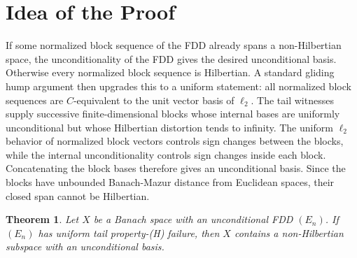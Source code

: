 \documentclass[11pt]{article}
\newtheorem{theorem}{Theorem}
\begin{document}
\section*{Idea of the Proof}

If some normalized block sequence of the FDD already spans a non-Hilbertian
space, the unconditionality of the FDD gives the desired unconditional basis.
Otherwise every normalized block sequence is Hilbertian. A standard gliding
hump argument then upgrades this to a uniform statement: all normalized block
sequences are \(C\)-equivalent to the unit vector basis of \(\ell_2\). The
tail witnesses supply successive finite-dimensional blocks whose internal
bases are uniformly unconditional but whose Hilbertian distortion tends to
infinity. The uniform \(\ell_2\) behavior of normalized block vectors controls
sign changes between the blocks, while the internal unconditionality controls
sign changes inside each block. Concatenating the block bases therefore gives
an unconditional basis. Since the blocks have unbounded Banach-Mazur distance
from Euclidean spaces, their closed span cannot be Hilbertian.

\begin{theorem}
Let \(X\) be a Banach space with an unconditional FDD \((E_n)\). If
\((E_n)\) has uniform tail property-(H) failure, then \(X\) contains a
non-Hilbertian subspace with an unconditional basis.
\end{theorem}
\end{document}
